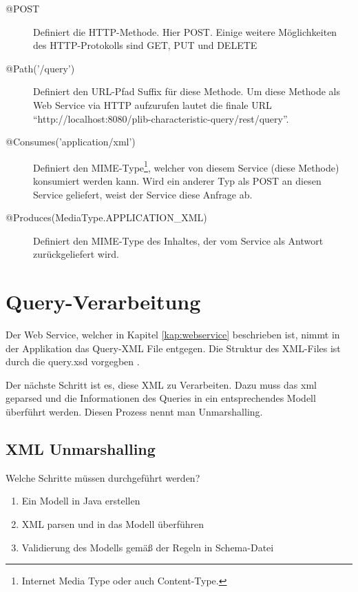 \begin{description}
\item[@POST] Definiert die \gls{HTTP-Methode}. Hier POST. Einige weitere Möglichkeiten des HTTP-Protokolls sind GET, PUT und DELETE
\item[@Path('/query')] Definiert den URL-Pfad Suffix für diese Methode. Um diese Methode als Web Service via HTTP aufzurufen lautet die finale URL \enquote{http://localhost:8080/plib-characteristic-query/rest/query}. 
\item[@Consumes('application/xml')] Definiert den \gls{MIME-Type}\footnote{Internet Media Type oder auch Content-Type.}, welcher von diesem Service (diese Methode) konsumiert werden kann. Wird ein anderer Typ als POST an diesen Service geliefert, weist der Service diese Anfrage ab. 
\item[@Produces(MediaType.APPLICATION\_XML)] Definiert den \gls{MIME-Type} des Inhaltes, der vom Service als Antwort zurückgeliefert wird.  
\end{description}

% 
\section{Query-Verarbeitung}

Der \gls{Web Service}, welcher in Kapitel \ref{kap:webservice} beschrieben ist, nimmt in der Applikation das Query-XML File entgegen. 
Die Struktur des XML-Files ist durch die query.xsd vorgegben \citep[27]{iso29002-31}. 

Der nächste Schritt ist es, diese XML zu Verarbeiten. Dazu muss das xml geparsed und die Informationen des Queries in ein entsprechendes Modell überführt werden. Diesen Prozess nennt man Unmarshalling.

\subsection{XML Unmarshalling}

Welche Schritte müssen durchgeführt werden?

\begin{enumerate}
\item Ein Modell in Java erstellen
\item XML parsen und in das Modell überführen
\item Validierung des Modells gemäß der Regeln in Schema-Datei
\end{enumerate}

